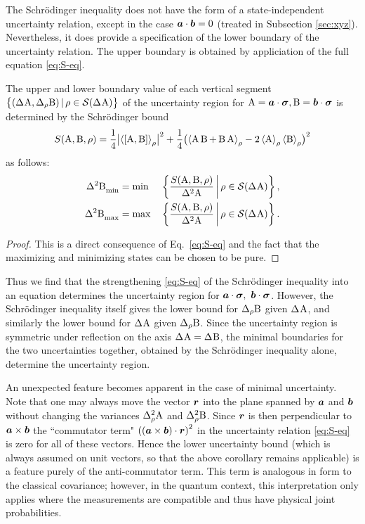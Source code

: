 The Schr\"odinger inequality does not have the form of a  state-independent uncertainty relation, except in the case $\bm{a}\cdot\bm{b}=0$ (treated in Subsection \ref{sec:xyz}).
Nevertheless, it does provide a specification of the lower boundary of the uncertainty relation. The upper boundary is obtained  by appliciation of the full equation \eqref{eq:S-eq}.
\begin{cor}
  The upper and lower boundary value of each vertical segment  $\bigl\{(\sdev{\opa},\sdevr{\opb})\,|\, \rho\in\si(\sdev{\opa})\bigr\}$ of the uncertainty region for $\operatorname{A}=\bm{a}\cdot{\boldsymbol\sigma},\operatorname{B}=\bm{b}\cdot{\boldsymbol\sigma}$ is determined by the Schr\"odinger bound
  \begin{equation}
    S(\operatorname{A},\operatorname{B},\rho)=\frac14 \bigl|\left\langle {\left[\operatorname{A},\operatorname{B}\right]}\right\rangle_\rho\bigr|^2+\frac14 \bigl(\left\langle {\operatorname{A}\operatorname{B}+ \operatorname{B}\operatorname{A}}\right\rangle_\rho-2\left\langle {\operatorname{A}}\right\rangle_\rho\left\langle {\operatorname{B}}\right\rangle_\rho\bigr)^2
  \end{equation}
  as follows: 
  \begin{alignat}{2} %
    \varmin{\opb}&=\min&&\left\{\frac{S(\opa,\opb,\rho)}{\var{\opa}}\,\middle|\,\rho\in\si(\sdev{\opa})\right\},\\
    \varmax{\opb}&=\max&&\left\{\frac{S(\opa,\opb,\rho)}{\var{\opa}}\,\middle|\,\rho\in\si(\sdev{\opa})\right\}.
  \end{alignat}
\end{cor}
\begin{proof}
  This is a direct consequence of Eq.~\eqref{eq:S-eq} and the fact that the maximizing and minimizing states can be chosen to be pure.
\end{proof}
Thus we find that the strengthening \eqref{eq:S-eq} of the Schr\"odinger inequality into an equation determines the uncertainty region for $\bm{a}\cdot{\boldsymbol\sigma},\ \bm{b}\cdot{\boldsymbol\sigma}$. However, the Schr\"odinger inequality itself gives the lower bound for $\sdevr{\opb}$ given $\sdev{\opa}$, and similarly the lower bound for $\sdev{\opa}$ given $\sdevr{\opb}$. Since the uncertainty region is symmetric under reflection on the axis $\sdev{\opa}=\sdev{\opb}$, the minimal boundaries for the two uncertainties together, obtained by the Schr\"odinger inequality alone, determine the uncertainty region.

An unexpected feature becomes apparent in the case of minimal uncertainty. Note that one may always move the vector $\bm{r}$ into the plane spanned by $\bm{a}$ and $\bm{b}$ without changing the variances $\varr{\opa}$ and $\varr{\opb}$. Since $\bm{r}$ is then perpendicular to $\bm{a}\times\bm{b}$ the ``commutator term" $\left(\left(\bm{a}\times\bm{b}\right)\cdot\bm{r}\right)^2$ in the uncertainty relation \eqref{eq:S-eq} is zero for all of these vectors. Hence the lower uncertainty bound (which is always assumed on unit vectors, so that the above corollary remains applicable) is a feature purely of the anti-commutator term. 
This term is analogous in form to the classical covariance; however, in the quantum context, this interpretation only applies where the measurements are compatible and thus have physical joint probabilities.


